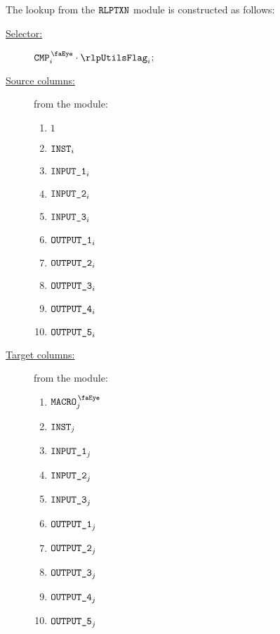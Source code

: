 The lookup from the $\texttt{RLPTXN}$ module is constructed as follows:
\begin{description}
	\item[\underline{Selector:}] $\isCmp_{i} \cdot \rlpUtilsFlag_{i}$;
	\item[\underline{Source columns:}] from the \rlpTxnMod{} module:
	\begin{multicols}{3}
	\begin{enumerate}
		\item $1$
		\item $\texttt{INST}_{i}$
		\item $\texttt{INPUT\_1}_{i}$
		\item $\texttt{INPUT\_2}_{i}$
		\item $\texttt{INPUT\_3}_{i}$
		\item $\texttt{OUTPUT\_1}_{i}$
		\item $\texttt{OUTPUT\_2}_{i}$
		\item $\texttt{OUTPUT\_3}_{i}$
		\item $\texttt{OUTPUT\_4}_{i}$
		\item $\texttt{OUTPUT\_5}_{i}$
		
	\end{enumerate}
	\end{multicols}
\item[\underline{Target columns:}] from the \rlpUtilsMod{} module: 
	\begin{multicols}{3}
	\begin{enumerate}
		\item $\isRlpUtilsMacro_{j}$
		\item $\texttt{INST}_{j}$
		\item $\texttt{INPUT\_1}_{j}$
		\item $\texttt{INPUT\_2}_{j}$
		\item $\texttt{INPUT\_3}_{j}$
		\item $\texttt{OUTPUT\_1}_{j}$
		\item $\texttt{OUTPUT\_2}_{j}$
		\item $\texttt{OUTPUT\_3}_{j}$
		\item $\texttt{OUTPUT\_4}_{j}$
		\item $\texttt{OUTPUT\_5}_{j}$
	\end{enumerate} 
	\end{multicols}
\end{description}